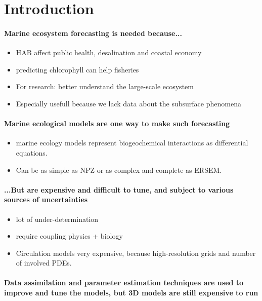 \section{Introduction}

\paragraph{Marine ecosystem forecasting is needed because...}

\begin{itemize}
  \item HAB affect public health, desalination and coastal economy
  \item predicting chlorophyll can help fisheries
  \item For research: better understand the large-scale ecosystem
  \item Especially usefull because we lack data about the subsurface
phenomena
\end{itemize}

\paragraph{Marine ecological models are one way to make such forecasting}

\begin{itemize}
  \item marine ecology models represent biogeochemical interactions as
differential equations.
  \item Can be as simple as NPZ or as complex and complete as ERSEM.
\end{itemize}

\paragraph{...But are expensive and difficult to tune, and subject to
various sources of uncertainties}

\begin{itemize}
  \item \citep{Anderson2005} lot of under-determination
  \item require coupling physics + biology
  \item Circulation models very expensive, because high-resolution grids
and number of involved PDEs.
\end{itemize}

\paragraph{Data assimilation and parameter estimation techniques are
used to improve and tune the models, but 3D models are still expensive
to run}

